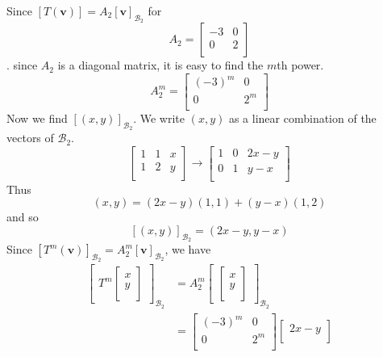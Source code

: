 \documentclass{article}
\begin{document}
\begin{example}
  Since $[T(\textbf{v})] = A_2[\textbf{v}]_{\mathcal{B}_2}$ for \[A_2 =
    \begin{bmatrix}
      -3 & 0\\
      0 & 2\\
  \end{bmatrix}\]. since $A_2$ is a diagonal matrix, it is easy to find the $m$th power.
  \[
    A_2^m =
    \begin{bmatrix}
      (-3)^m & 0\\
      0 & 2^m\\
    \end{bmatrix}
  \]
  Now we find $[(x, y)]_{\mathcal{B}_2}$. We write $(x, y)$ as a linear combination of the vectors of $\mathcal{B}_2$. \[
    \begin{bmatrix}
      1 & 1 & x\\
      1 & 2 & y\\
    \end{bmatrix} \to
    \begin{bmatrix}
      1 & 0 & 2x - y\\
      0 & 1 & y- x\\
    \end{bmatrix}
  \]
  Thus \[
    (x, y) = (2x - y)(1, 1) + (y - x)(1, 2)
  \] and so \[
    [(x, y)]_{\mathcal{B}_2} = (2x - y, y - x)
  \]
  Since $[T^m(\textbf{v})]_{\mathcal{B}_2} = A_2^m[\textbf{v}]_{\mathcal{B}_2}$, we have
  \begin{align*}
    \begin{bmatrix}
      T^m
      \begin{bmatrix}
        x\\y\\
      \end{bmatrix}
    \end{bmatrix}_{\mathcal{B}_2} &= A_2^m
    \begin{bmatrix}
      \begin{bmatrix}
        x\\y\\
      \end{bmatrix}
    \end{bmatrix}_{\mathcal{B}_2}\\
    &=
    \begin{bmatrix}
      (-3)^m & 0\\
      0 & 2^m\\
    \end{bmatrix}
    \begin{bmatrix}
      2x - y\\

\end{bmatrix}
\end{align*}
\end{example}
\end{document}
